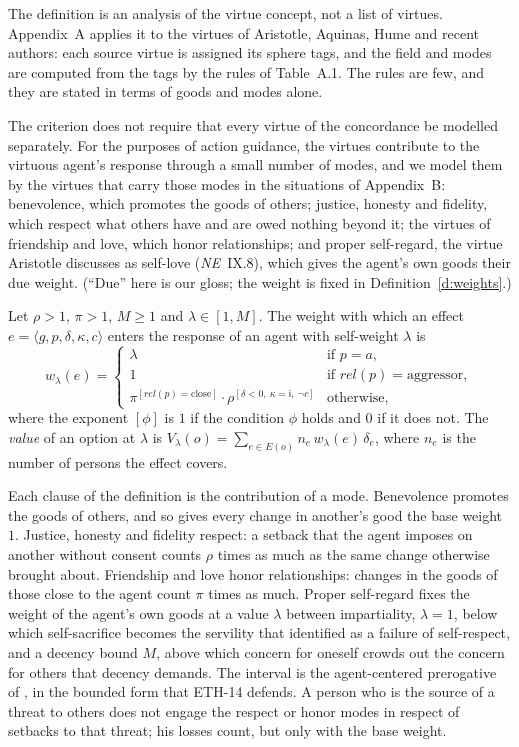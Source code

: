 \documentclass{situationist-preprint}
\begin{document}
The definition is an analysis of the virtue concept, not a list of virtues. Appendix~A applies it to the virtues of Aristotle, Aquinas, Hume and recent authors: each source virtue is assigned its sphere tags, and the field and modes are computed from the tags by the rules of Table~A.1. The rules are few, and they are stated in terms of goods and modes alone.

The criterion does not require that every virtue of the concordance be modelled separately. For the purposes of action guidance, the virtues contribute to the virtuous agent's response through a small number of modes, and we model them by the virtues that carry those modes in the situations of Appendix~B: benevolence, which promotes the goods of others; justice, honesty and fidelity, which respect what others have and are owed nothing beyond it; the virtues of friendship and love, which honor relationships; and proper self-regard, the virtue Aristotle discusses as self-love (\emph{NE}~IX.8), which gives the agent's own goods their due weight. (\enquote{Due} here is our gloss; the weight is fixed in Definition~\ref{d:weights}.)

\begin{definition}\label{d:weights}
Let $\rho>1$, $\pi>1$, $M\geq 1$ and $\lambda\in[1,M]$. The weight with which an effect $e=\langle g,p,\delta,\kappa,c\rangle$ enters the response of an agent with self-weight $\lambda$ is
\[
w_\lambda(e)=\begin{cases}
\lambda & \text{if } p=a,\\
1 & \text{if } \mathit{rel}(p)=\text{aggressor},\\
\pi^{[\mathit{rel}(p)=\text{close}]}\cdot\rho^{[\delta<0,\ \kappa=\mathsf{i},\ \neg c]} & \text{otherwise,}
\end{cases}
\]
where the exponent $[\phi]$ is $1$ if the condition $\phi$ holds and $0$ if it does not. The \emph{value} of an option at $\lambda$ is $V_\lambda(o)=\sum_{e\in E(o)} n_e\,w_\lambda(e)\,\delta_e$, where $n_e$ is the number of persons the effect covers.
\end{definition}

Each clause of the definition is the contribution of a mode. Benevolence promotes the goods of others, and so gives every change in another's good the base weight $1$. Justice, honesty and fidelity respect: a setback that the agent imposes on another without consent counts $\rho$ times as much as the same change otherwise brought about. Friendship and love honor relationships: changes in the goods of those close to the agent count $\pi$ times as much. Proper self-regard fixes the weight of the agent's own goods at a value $\lambda$ between impartiality, $\lambda=1$, below which self-sacrifice becomes the servility that \citet{Hill1973} identified as a failure of self-respect, and a decency bound $M$, above which concern for oneself crowds out the concern for others that decency demands. The interval is the agent-centered prerogative of \citet{Scheffler1982}, in the bounded form that ETH-14 defends. A person who is the source of a threat to others does not engage the respect or honor modes in respect of setbacks to that threat; his losses count, but only with the base weight.
\end{document}
